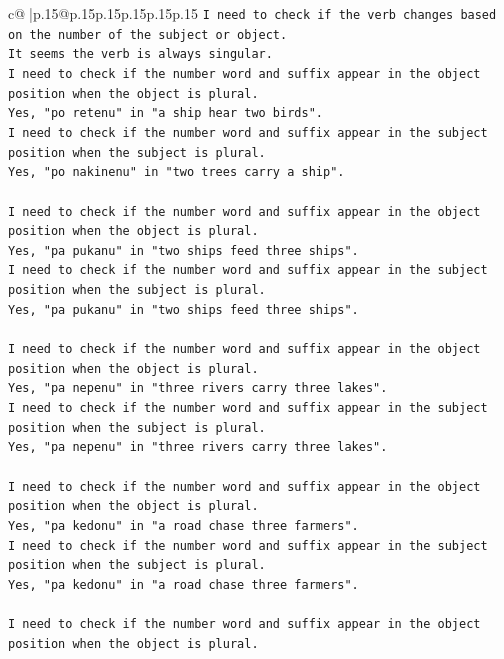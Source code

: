 \documentclass{article}
\begin{document}
{\begin{supertabular}{c@{$\;$}|p{.15\linewidth}@{}p{.15\linewidth}p{.15\linewidth}p{.15\linewidth}p{.15\linewidth}p{.15\linewidth}}
{{{\texttt{I need to check if the verb changes based on the number of the subject or object.} \\
\texttt{It seems the verb is always singular.} \\
\texttt{I need to check if the number word and suffix appear in the object position when the object is plural.} \\
\texttt{Yes, "po retenu" in "a ship hear two birds".} \\
\texttt{I need to check if the number word and suffix appear in the subject position when the subject is plural.} \\
\texttt{Yes, "po nakinenu" in "two trees carry a ship".} \\
\\ 
\texttt{I need to check if the number word and suffix appear in the object position when the object is plural.} \\
\texttt{Yes, "pa pukanu" in "two ships feed three ships".} \\
\texttt{I need to check if the number word and suffix appear in the subject position when the subject is plural.} \\
\texttt{Yes, "pa pukanu" in "two ships feed three ships".} \\
\\ 
\texttt{I need to check if the number word and suffix appear in the object position when the object is plural.} \\
\texttt{Yes, "pa nepenu" in "three rivers carry three lakes".} \\
\texttt{I need to check if the number word and suffix appear in the subject position when the subject is plural.} \\
\texttt{Yes, "pa nepenu" in "three rivers carry three lakes".} \\
\\ 
\texttt{I need to check if the number word and suffix appear in the object position when the object is plural.} \\
\texttt{Yes, "pa kedonu" in "a road chase three farmers".} \\
\texttt{I need to check if the number word and suffix appear in the subject position when the subject is plural.} \\
\texttt{Yes, "pa kedonu" in "a road chase three farmers".} \\
\\ 
\texttt{I need to check if the number word and suffix appear in the object position when the object is plural.} \\
}}}
\end{supertabular}}
\end{document}
